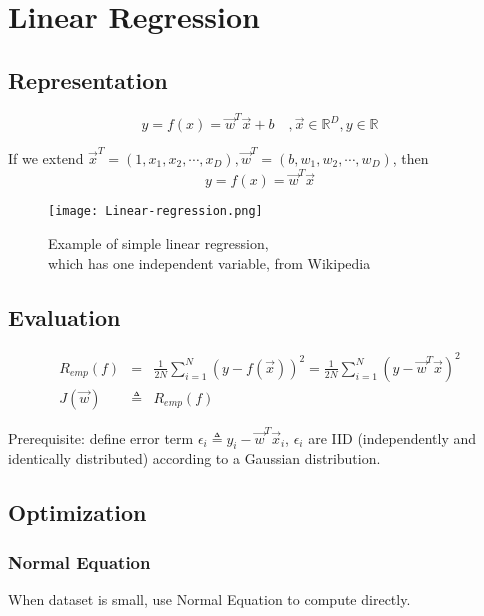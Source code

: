 \chapter{Linear Regression}


\section{Representation}

\begin{equation}
y=f(x)=\vec{w}^T\vec{x}+b \quad , \vec{x} \in \mathbb{R}^D, y \in \mathbb{R}
\end{equation}

If we extend $\vec{x}^T=(1,x_1,x_2,\cdots,x_D),\vec{w}^T=(b,w_1,w_2,\cdots,w_D)$, then
\begin{equation}
y=f(x)=\vec{w}^T\vec{x}
\end{equation}


\begin{figure}[hbtp]
\centering
    \texttt{[image: Linear-regression.png]}
\caption{Example of simple linear regression, \\ which has one independent variable, from Wikipedia}
\label{fig:Linear-regression} 
\end{figure}


\section{Evaluation}

\begin{eqnarray}
R_{emp}(f) &=& \frac{1}{2N}\sum\limits_{i=1}^N \left(y-f(\vec{x})\right)^2=\frac{1}{2N}\sum\limits_{i=1}^N \left(y-\vec{w}^T\vec{x}\right)^2 \\
J(\vec{w}) &\triangleq& R_{emp}(f)
\end{eqnarray}

Prerequisite: define error term $\epsilon_i \triangleq y_i-\vec{w}^T\vec{x}_i$, $\epsilon_i$ are IID (independently and identically distributed) according to a Gaussian distribution. 


\section{Optimization}


\subsection{Normal Equation}
When dataset is small, use Normal Equation to compute  directly.

